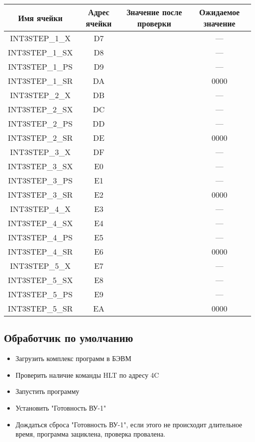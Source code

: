 \begin{center}
	\begin{tabular}{|c|c|c|c|}
		\hline
		Имя ячейки & Адрес ячейки & Значение после проверки & Ожидаемое значение \\
		\hline \hline
		INT3STEP\_1\_X & D7 &  & --- \\\hline
		INT3STEP\_1\_SX & D8 &  & --- \\\hline
		INT3STEP\_1\_PS & D9 &  & --- \\\hline
		INT3STEP\_1\_SR & DA &  & 0000 \\\hline
		INT3STEP\_2\_X & DB &  & --- \\\hline
		INT3STEP\_2\_SX & DC &  & --- \\\hline
		INT3STEP\_2\_PS & DD &  & --- \\\hline
		INT3STEP\_2\_SR & DE &  & 0000 \\\hline
		INT3STEP\_3\_X & DF &  & --- \\\hline
		INT3STEP\_3\_SX & E0 &  & --- \\\hline
		INT3STEP\_3\_PS & E1 &  & --- \\\hline
		INT3STEP\_3\_SR & E2 &  & 0000 \\\hline
		INT3STEP\_4\_X & E3 &  & --- \\\hline
		INT3STEP\_4\_SX & E4 &  & --- \\\hline
		INT3STEP\_4\_PS & E5 &  & --- \\\hline
		INT3STEP\_4\_SR & E6 &  & 0000 \\\hline
		INT3STEP\_5\_X & E7 &  & --- \\\hline
		INT3STEP\_5\_SX & E8 &  & --- \\\hline
		INT3STEP\_5\_PS & E9 &  & --- \\\hline
		INT3STEP\_5\_SR & EA &  & 0000 \\\hline
		
		
		\hline
	\end{tabular}
\end{center}

\newpage
\subsection{Обработчик по умолчанию}

\begin{itemize}
	\item Загрузить комплекс программ в БЭВМ
	\item Проверить наличие команды HLT по адресу 4C
	\item Запустить программу
	\item Установить "Готовность ВУ-1"
	\item Дождаться сброса "Готовность ВУ-1", если этого не происходит длительное время, программа зациклена, проверка провалена.
\end{itemize}

